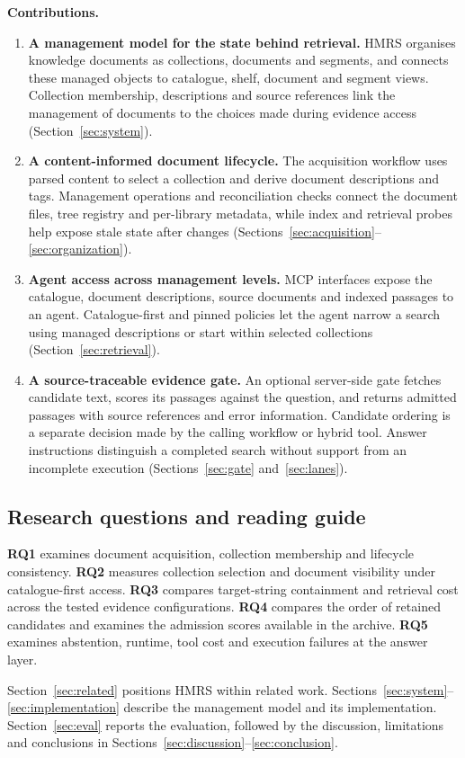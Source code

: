 \noindent\textbf{Contributions.}
\begin{enumerate}
\item \textbf{A management model for the state behind retrieval.} HMRS
organises knowledge documents as collections, documents and segments, and
connects these managed objects to catalogue, shelf, document and segment
views. Collection membership, descriptions and source references link the
management of documents to the choices made during evidence access
(Section~\ref{sec:system}).
\item \textbf{A content-informed document lifecycle.} The acquisition
workflow uses parsed content to select a collection and derive document
descriptions and tags. Management operations and reconciliation checks
connect the document files, tree registry and per-library metadata, while
index and retrieval probes help expose stale state after changes
(Sections~\ref{sec:acquisition}--\ref{sec:organization}).
\item \textbf{Agent access across management levels.} MCP interfaces expose
the catalogue, document descriptions, source documents and indexed passages
to an agent. Catalogue-first and pinned policies let the agent narrow a
search using managed descriptions or start within selected collections
(Section~\ref{sec:retrieval}).
\item \textbf{A source-traceable evidence gate.} An optional server-side
gate fetches candidate text, scores its passages against the question, and
returns admitted passages with source references and error information.
Candidate ordering is a separate decision made by the calling workflow or
hybrid tool. Answer instructions distinguish a completed search without
support from an incomplete execution
(Sections~\ref{sec:gate} and~\ref{sec:lanes}).
\end{enumerate}

\subsection{Research questions and reading guide}
\label{sec:rq}

\textbf{RQ1} examines document acquisition, collection membership and
lifecycle consistency. \textbf{RQ2} measures collection selection and
document visibility under catalogue-first access. \textbf{RQ3} compares
target-string containment and retrieval cost across the tested evidence
configurations. \textbf{RQ4} compares the order of retained candidates and
examines the admission scores available in the archive.
\textbf{RQ5} examines abstention, runtime, tool cost and execution failures
at the answer layer.

Section~\ref{sec:related} positions HMRS within related work.
Sections~\ref{sec:system}--\ref{sec:implementation} describe the management
model and its implementation. Section~\ref{sec:eval} reports the evaluation,
followed by the discussion, limitations and conclusions in
Sections~\ref{sec:discussion}--\ref{sec:conclusion}.
